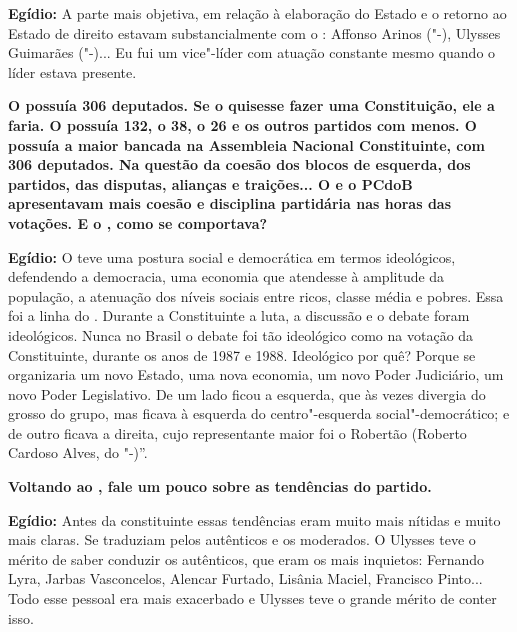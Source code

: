 \textbf{Egídio:} A parte mais objetiva, em relação à elaboração do
Estado e o retorno ao Estado de direito estavam substancialmente com o
: Affonso Arinos ("-), Ulysses Guimarães ("-)... Eu fui um
vice"-líder com atuação constante mesmo quando o líder estava presente.

\textbf{O  possuía 306 deputados. Se o  quisesse fazer uma
Constituição, ele a faria. O  possuía 132, o  38, o  26 e os
outros partidos com menos. O  possuía a maior bancada na Assembleia
Nacional Constituinte, com 306 deputados. Na questão da coesão dos
blocos de esquerda, dos partidos, das disputas, alianças e traições... O
 e o PCdoB apresentavam mais coesão e disciplina partidária nas horas
das votações. E o , como se comportava?}

\textbf{Egídio:} O  teve uma postura social e democrática em termos
ideológicos, defendendo a democracia, uma economia que atendesse à
amplitude da população, a atenuação dos níveis sociais entre ricos,
classe média e pobres. Essa foi a linha do . Durante a Constituinte
a luta, a discussão e o debate foram ideológicos. Nunca no Brasil o
debate foi tão ideológico como na votação da Constituinte, durante os
anos de 1987 e 1988. Ideológico por quê? Porque se organizaria um novo
Estado, uma nova economia, um novo Poder Judiciário, um novo Poder
Legislativo. De um lado ficou a esquerda, que às vezes divergia do
grosso do grupo, mas ficava à esquerda do centro"-esquerda
social"-democrático; e de outro ficava a direita, cujo representante
maior foi o Robertão (Roberto Cardoso Alves, do "-)''.

\textbf{Voltando ao , fale um pouco sobre as tendências do partido.}

\textbf{Egídio:} Antes da constituinte essas tendências eram muito mais
nítidas e muito mais claras. Se traduziam pelos autênticos e os
moderados. O Ulysses teve o mérito de saber conduzir os autênticos, que
eram os mais inquietos: Fernando Lyra, Jarbas Vasconcelos, Alencar
Furtado, Lisânia Maciel, Francisco Pinto... Todo esse pessoal era mais
exacerbado e Ulysses teve o grande mérito de conter isso.

